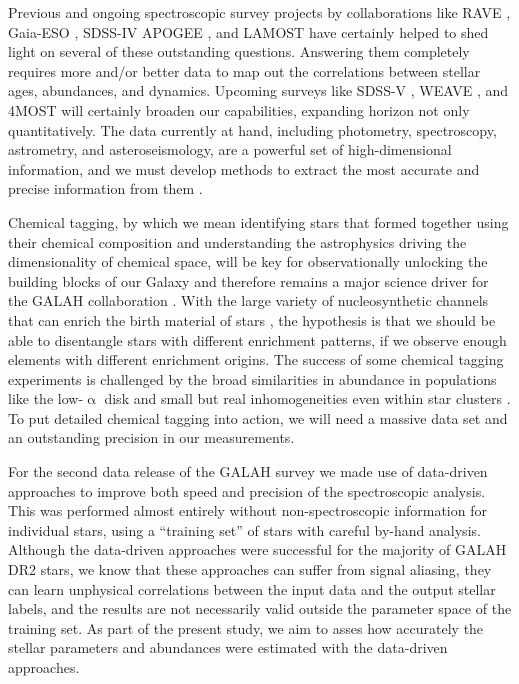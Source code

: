 \documentclass[fleqn,usenatbib,useAMS]{mnras}
\begin{document}
Previous and ongoing spectroscopic survey projects by collaborations like RAVE \citep{Steinmetz2020a, Steinmetz2020b}, Gaia-ESO \citep{Gilmore2012}, SDSS-IV APOGEE \citep{SDSSDR16}, and LAMOST \citep{Cui2012, Xiang2019} have certainly helped to shed light on several of these outstanding questions. Answering them completely requires more and/or better data to map out the correlations between stellar ages, abundances, and dynamics. Upcoming surveys like SDSS-V \citep{Kollmeier2017}, WEAVE \citep{WEAVE2018}, and 4MOST \citep{4MOST2019} will certainly broaden our capabilities, expanding horizon not only quantitatively. The data currently at hand, including photometry, spectroscopy, astrometry, and asteroseismology, are a powerful set of high-dimensional information, and we must develop methods to extract the most accurate and precise information from them \citep[for reviews on this see e. g.][]{Jofre2018b, Nissen2018}.

Chemical tagging, by which we mean identifying stars that formed together using their chemical composition and understanding the astrophysics driving the dimensionality of chemical space, will be key for observationally unlocking the building blocks of our Galaxy and therefore remains a major science driver for the GALAH collaboration \citep{DeSilva2015}. With the large variety of nucleosynthetic channels that can enrich the birth material of stars \citep[see e.g.][]{Kobayashi2020}, the hypothesis is that we should be able to disentangle stars with different enrichment patterns, if we observe enough elements with different enrichment origins. The success of some chemical tagging experiments \citep[see e.g.][]{Kos2018, PriceJones2020} is challenged by the broad similarities in abundance in populations like the low-$\upalpha$ disk \citep[see e.g.][]{Ness2018} and small but real inhomogeneities even within star clusters \citep{Liu2016,Liu2016b}. To put detailed chemical tagging into action, we will need a massive data set \citep[see e.g.][]{Ting2016} and an outstanding precision in our measurements.

For the second data release of the GALAH survey \citep{Buder2018} we made use of data-driven approaches to improve both speed and precision of the spectroscopic analysis. This was performed almost entirely without non-spectroscopic information for individual stars, using a ``training set'' of stars with careful by-hand analysis.
Although the data-driven approaches were successful for the majority of GALAH DR2 stars, we know that these approaches can suffer from signal aliasing, they can learn unphysical correlations between the input data and the output stellar labels, and the results are not necessarily valid outside the parameter space of the training set. As part of the present study, we aim to asses how accurately the stellar parameters and abundances were estimated with the data-driven approaches. 
\end{document}
